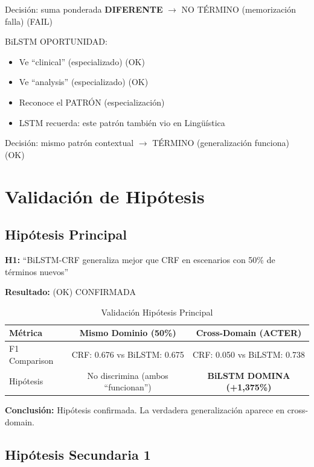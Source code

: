 Decisión: suma ponderada \textbf{DIFERENTE} $\rightarrow$ NO TÉRMINO (memorización falla) (FAIL)

BiLSTM OPORTUNIDAD:
\begin{itemize}
    \item Ve ``clinical'' (especializado) (OK)
    \item Ve ``analysis'' (especializado) (OK)
    \item Reconoce el PATRÓN (especialización)
    \item LSTM recuerda: este patrón también vio en Lingüística
\end{itemize}

Decisión: mismo patrón contextual $\rightarrow$ TÉRMINO (generalización funciona) (OK)

\section{Validación de Hipótesis}

\subsection{Hipótesis Principal}

\textbf{H1:} ``BiLSTM-CRF generaliza mejor que CRF en escenarios con 50\% de términos nuevos''

\textbf{Resultado:} (OK) CONFIRMADA

\begin{table}[H]
\centering
\caption{Validación Hipótesis Principal}
\label{tab:hypothesis_main}
\begin{tabular}{lcc}
\toprule
\textbf{Métrica} & \textbf{Mismo Dominio (50\%)} & \textbf{Cross-Domain (ACTER)} \\
\midrule
F1 Comparison & CRF: 0.676 vs BiLSTM: 0.675 & CRF: 0.050 vs BiLSTM: 0.738 \\
Hipótesis & No discrimina (ambos ``funcionan'') & \textbf{BiLSTM DOMINA (+1,375\%)} \\
\bottomrule
\end{tabular}
\end{table}

\textbf{Conclusión:} Hipótesis confirmada. La verdadera generalización aparece en cross-domain.

\subsection{Hipótesis Secundaria 1}

